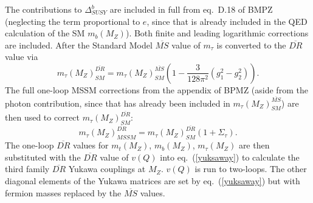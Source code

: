\documentclass{article}
\begin{document}
The contributions to $\Delta_{SUSY}^b$ are
included in full from eq.~D.18 of BMPZ (neglecting the term proportional to
$e$, since that is already included in the QED calculation of the SM 
$m_b(M_Z)$).
Both finite and leading logarithmic
corrections are included.
After the Standard Model $\overline{MS}$ value of $m_\tau$ is converted to the
$\overline{DR}$ value via
\begin{equation}
m_\tau(M_Z)^{\overline{DR}}_{SM} = m_\tau(M_Z)^{\overline{MS}}_{SM}
\left( 1 - \frac{3}{128 \pi^2} (g_1^2 - g_2^2)\right).
\end{equation}
The full one-loop MSSM corrections from the appendix 
of BPMZ 
(aside from the photon
contribution, since that has already been included in
$m_\tau(M_Z)^{\overline{MS}}_{SM}$) 
are then used to correct
$m_\tau(M_Z)^{\overline{DR}}_{SM}$:
\begin{equation}
m_\tau(M_Z)^{\overline{DR}}_{MSSM} = m_\tau(M_Z)^{\overline{DR}}_{SM}
 (1 + \Sigma_\tau).
\end{equation}
The one-loop $\overline{DR}$ values for $m_t(M_Z)$, $m_b(M_Z)$,
$m_{\tau}(M_Z)$ are then substituted with the $\overline{DR}$ value
of $v(Q)$ into eq.~(\ref{yuksaway}) to calculate the third family
$\overline{DR}$ Yukawa couplings at $M_Z$.
$v(Q)$ is run to two-loops.
The other diagonal elements of the Yukawa matrices are set by
eq.~(\ref{yuksaway}) but with fermion masses replaced by the $\overline{MS}$
values. 
\end{document}
